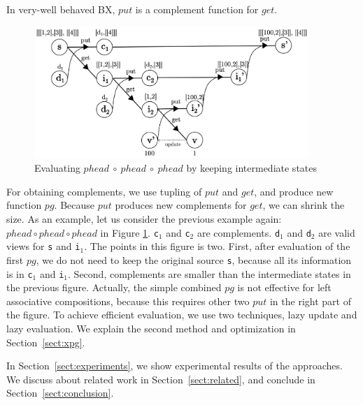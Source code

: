 \vspace{2mm}
In very-well behaved \cite{Foster:2007:CBT:1232420.1232424} BX,%
$put$ is a complement function for $get$.
\vspace{2mm}

\begin{figure}[!t]
  \centering
  \includegraphics[height=5cm]{./fig/fig3.eps}
  \caption{Evaluating $phead \ \circ \ phead \ \circ \ phead$ by keeping intermediate states}
  \label{fig:eval-comp-phead-2}
\end{figure}

\noindent For obtaining complements, we use tupling of $put$ and $get$, and produce new function $pg$. Because $put$ produces new complements for $get$, we can shrink the size.
As an example, let us consider the previous example again: $phead \circ phead \circ phead$ in Figure \ref{fig:eval-comp-phead-2}. \texttt{c$_1$} and \texttt{c$_2$} are complements. \texttt{d$_1$} and \texttt{d$_2$} are valid views for \texttt{s} and \texttt{i$_1$}. The points in this figure is two. First, after evaluation of the first $pg$, we do not need to keep the original source \texttt{s}, because all its information is in \texttt{c$_1$} and \texttt{i$_1$}. Second, complements are smaller than the intermediate states in the previous figure.
Actually, the simple combined $pg$ is not effective for left associative compositions, because this requires other two $put$ in the right part of the figure. To achieve efficient evaluation, we use two techniques, lazy update and lazy evaluation. We explain the second method and optimization in Section~\ref{sect:xpg}.

In Section~\ref{sect:experiments}, we show experimental results of the approaches. We discuss about related work in Section~\ref{sect:related}, and conclude in Section~\ref{sect:conclusion}.


